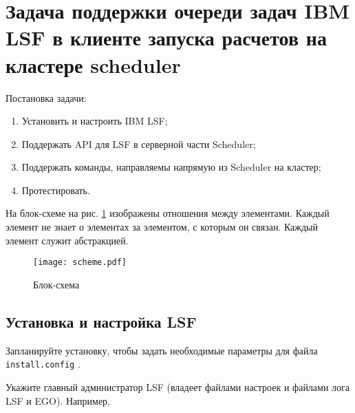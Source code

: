 \section{Задача поддержки очереди задач IBM LSF в клиенте запуска расчетов на кластере scheduler}


Постановка задачи:

\begin{enumerate}
    \item Установить и настроить IBM LSF;
    \item Поддержать API для LSF в серверной части Scheduler;
    \item Поддержать команды, направляемы напрямую из Scheduler на кластер;
    \item Протестировать.
\end{enumerate}

На блок-схеме на рис. \ref{fig:block-scheme} изображены отношения между элементами. Каждый элемент не знает о элементах за элементом, с которым он связан. Каждый элемент служит абстракцией.

\begin{figure}[h]
    \centering
    \texttt{[image: scheme.pdf]}
    \caption{Блок-схема}
    \label{fig:block-scheme}
\end{figure}




\subsection{Установка и настройка LSF}


Запланируйте установку, чтобы задать необходимые параметры для файла \lstinline{install.config} \cite{install_plan}.

Укажите главный администратор LSF (владеет файлами настроек и файлами лога LSF и EGO). Например,

